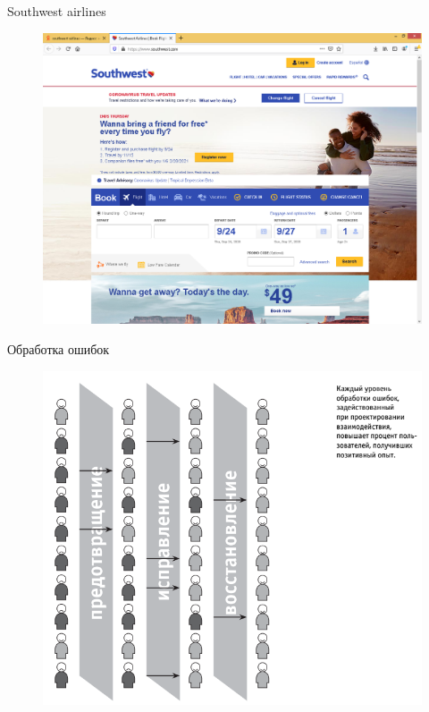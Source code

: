 \documentclass{beamer}
\begin{document}
\begin{frame}[t]{Southwest airlines}
\begin{figure}[h]
\centering
\includegraphics[scale=0.3]{images/lec03-pic04.png}
\end{figure}
\end{frame} 


\begin{frame}[t]{Обработка ошибок}
\begin{figure}[h]
\centering
\includegraphics[scale=0.3]{images/lec03-pic06.png}
\end{figure}
\end{frame} 
\end{document}
